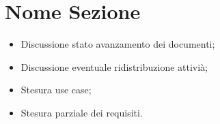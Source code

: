 \documentclass[../Riunione16-01-12.tex]{subfiles}
\begin{document}
\section{Nome Sezione}
\begin{itemize}
	\item Discussione stato avanzamento dei documenti;
	\item Discussione eventuale ridistribuzione attivià;
	\item Stesura use case;
	\item Stesura parziale dei requisiti.
\end{itemize}
\end{document}
